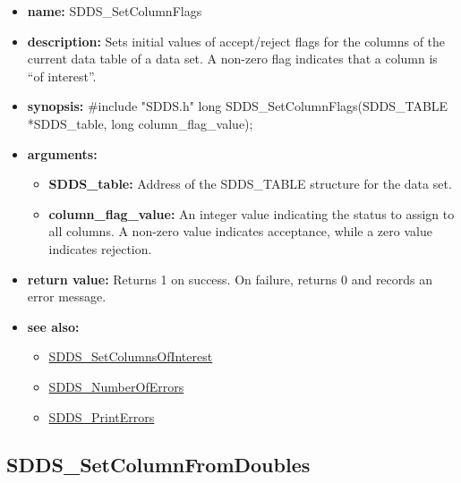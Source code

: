 \documentclass[11pt]{article}
\newcommand{\progref}[1]{\hyperref{SDDS_#1}{{\tt SDDS\_#1} (}{)}{SDDS_#1}}
\begin{document}
\begin{itemize}
\item {\bf name:}\newline
SDDS\_SetColumnFlags
\item {\bf description:}\newline
Sets initial values of accept/reject flags for the columns of the current data table of a data set. A non-zero flag indicates that a column is ``of interest''.
\item {\bf synopsis:} \#include "SDDS.h"\newline
long SDDS\_SetColumnFlags(SDDS\_TABLE *SDDS\_table, long column\_flag\_value);
\item {\bf arguments:}
\begin{itemize}
\item {\bf SDDS\_table:} Address of the SDDS\_TABLE structure for the data set.
\item {\bf column\_flag\_value:} An integer value indicating the status to assign to all columns. A non-zero value indicates acceptance, while a zero value indicates rejection.
\end{itemize}
\item {\bf return value:}\newline
Returns 1 on success. On failure, returns 0 and records an error message.
\item {\bf see also:}
\begin{itemize}
\item \progref{SetColumnsOfInterest}
\item \progref{NumberOfErrors}
\item \progref{PrintErrors}
\end{itemize}
\end{itemize}

\subsection{SDDS\_SetColumnFromDoubles}
\label{SDDS_SetColumnFromDoubles}
\end{document}
